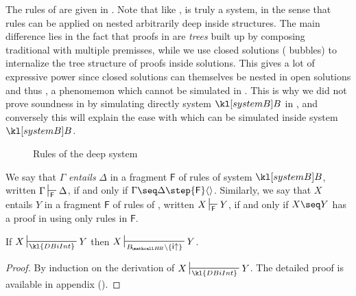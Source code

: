 The rules of  are given in . Note that like
,  is truly a \emph{} system, in the
sense that rules can be applied on  nested arbitrarily deep inside
structures. The main difference lies in the fact that
proofs in  are \emph{trees} built up by composing traditional
 with multiple premisses, while we use closed solutions (
bubbles) to internalize the tree structure of proofs inside solutions. This
gives a lot of expressive power since closed solutions can themselves be nested
in open solutions and thus \emph{}, a phenomemon which cannot be
simulated in . This is why we did not prove soundness in
 by simulating directly system $\sysB$ in
, and conversely this will explain the ease with which 
can be simulated inside system $\sysB$.

\begin{figure*}
  
  \caption{Rules of the deep  system }
\end{figure*}

\begin{definition}
  We say that $\Gamma$ \emph{entails} $\Delta$ in a fragment $\mathsf{F}$ of
  rules of system $\sysB$, written $\Gamma \prov{\mathsf{F}} \Delta$, if and
  only if $\Gamma \seq \Delta \step{\mathsf{F}} \piq{}$. Similarly, we say
  that $X$ entails $Y$ in a fragment $\mathsf{F}$ of rules of ,
  written $X \prov{\mathsf{F}} Y$, if and only if $X \seq Y$ has a proof in
   using only rules in $\mathsf{F}$.
\end{definition}

\begin{lemma}
  
  If $X \prov{\kl{DBiInt}} Y$ then $X \prov{\sysBHB \setminus
  \{\rsf{i{\ua}}\}} Y$.
\end{lemma}
\begin{proof}
  By induction on the derivation of $X \prov{\kl{DBiInt}} Y$. The detailed
  proof is available in appendix (). 
\end{proof}

